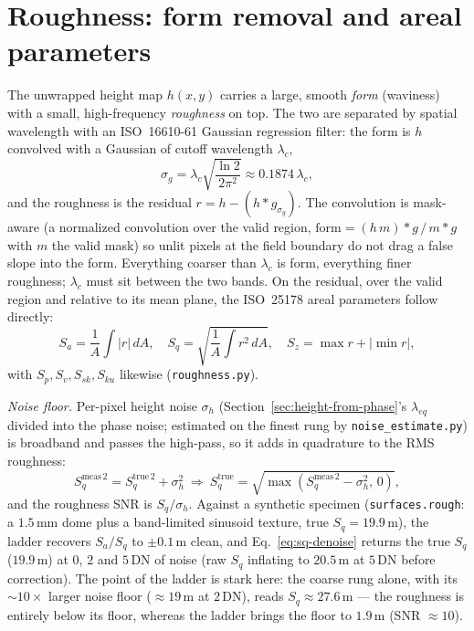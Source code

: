 \documentclass[11pt]{article}
\begin{document}
\section{Roughness: form removal and areal parameters}
\label{sec:roughness}

The unwrapped height map $h(x,y)$ carries a large, smooth \emph{form}
(waviness) with a small, high-frequency \emph{roughness} on top. The two
are separated by spatial wavelength with an ISO~16610-61 Gaussian
regression filter: the form is $h$ convolved with a Gaussian of cutoff
wavelength $\lambda_c$,
\begin{equation}
  \sigma_g = \lambda_c\sqrt{\frac{\ln 2}{2\pi^2}} \approx 0.1874\,\lambda_c,
\end{equation}
and the roughness is the residual $r = h - (h * g_{\sigma_g})$. The
convolution is mask-aware (a normalized convolution over the valid
region, $\text{form} = (h\,m)*g \,/\, m*g$ with $m$ the valid mask) so
unlit pixels at the field boundary do not drag a false slope into the
form. Everything coarser than $\lambda_c$ is form, everything finer
roughness; $\lambda_c$ must sit between the two bands. On the residual,
over the valid region and relative to its mean plane, the ISO~25178 areal
parameters follow directly:
\begin{equation}
  S_a = \frac1A\!\int|r|\,dA, \quad
  S_q = \sqrt{\frac1A\!\int r^2\,dA}, \quad
  S_z = \max r + |\!\min r|,
\end{equation}
with $S_p,S_v,S_{sk},S_{ku}$ likewise (\texttt{roughness.py}).

\emph{Noise floor.} Per-pixel height noise $\sigma_h$
(Section~\ref{sec:height-from-phase}'s $\lambda_{eq}$ divided into the
phase noise; estimated on the finest rung by \texttt{noise\_estimate.py})
is broadband and passes the high-pass, so it adds in quadrature to the RMS
roughness:
\begin{equation}
  S_q^{\text{meas}\,2} = S_q^{\text{true}\,2} + \sigma_h^2
  \ \Rightarrow\
  S_q^{\text{true}} = \sqrt{\max(S_q^{\text{meas}\,2} - \sigma_h^2,\,0)},
  \label{eq:sq-denoise}
\end{equation}
and the roughness SNR is $S_q/\sigma_h$. Against a synthetic specimen
(\texttt{surfaces.rough}: a $1.5$\,mm dome plus a band-limited sinusoid
texture, true $S_q=19.9$\,\textmu m), the ladder recovers $S_a/S_q$ to
$\pm0.1$\,\textmu m clean, and Eq.~\ref{eq:sq-denoise} returns the true
$S_q$ ($19.9$\,\textmu m) at $0$, $2$ and $5$\,DN of noise (raw $S_q$
inflating to $20.5$\,\textmu m at $5$\,DN before correction). The point of
the ladder is stark here: the coarse rung alone, with its $\sim\!10\times$
larger noise floor ($\approx19$\,\textmu m at $2$\,DN), reads
$S_q\approx27.6$\,\textmu m --- the roughness is entirely below its floor,
whereas the ladder brings the floor to $1.9$\,\textmu m (SNR $\approx10$).
\end{document}
